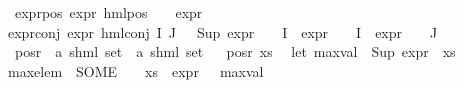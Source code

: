 \begin{isabellebody}
\ expr{\isacharunderscore}{\kern0pt}{}{\isacharunderscore}{\kern0pt}pos{\isacharcolon}{\kern0pt}\ {\isacartoucheopen}expr{\isacharunderscore}{\kern0pt}{}\ {\isacharparenleft}{\kern0pt}hml{\isacharunderscore}{\kern0pt}pos\ {\isasymalpha}\ {\isasymphi}{\isacharparenright}{\kern0pt}\ {\isacharequal}{\kern0pt}\ expr{\isacharunderscore}{\kern0pt}{}\ {\isasymphi}{\isacartoucheclose}\ {\isacharbar}{\kern0pt}\ \isanewline
expr{\isacharunderscore}{\kern0pt}{}{\isacharunderscore}{\kern0pt}conj{\isacharcolon}{\kern0pt}\ {\isacartoucheopen}expr{\isacharunderscore}{\kern0pt}{}\ {\isacharparenleft}{\kern0pt}hml{\isacharunderscore}{\kern0pt}conj\ I\ J\ {\isasymPhi}{\isacharparenright}{\kern0pt}\ {\isacharequal}{\kern0pt}\ {\isacharparenleft}{\kern0pt}Sup\ {\isacharparenleft}{\kern0pt}{\isacharparenleft}{\kern0pt}expr{\isacharunderscore}{\kern0pt}{}\ {\isasymcirc}\ {\isasymPhi}{\isacharparenright}{\kern0pt}\ {\isacharbackquote}{\kern0pt}\ I\ {\isasymunion}\ {\isacharparenleft}{\kern0pt}expr{\isacharunderscore}{\kern0pt}{}\ {\isasymcirc}\ {\isasymPhi}{\isacharparenright}{\kern0pt}\ {\isacharbackquote}{\kern0pt}\ I\ {\isasymunion}\ {\isacharparenleft}{\kern0pt}expr{\isacharunderscore}{\kern0pt}{}\ {\isasymcirc}\ {\isasymPhi}{\isacharparenright}{\kern0pt}\ {\isacharbackquote}{\kern0pt}\ J{\isacharparenright}{\kern0pt}{\isacharparenright}{\kern0pt}{\isacartoucheclose}\isanewline
\isanewline
{}\isamarkupfalse%
\ pos{\isacharunderscore}{\kern0pt}r\ {\isacharcolon}{\kern0pt}{\isacharcolon}{\kern0pt}\ {\isachardoublequoteopen}{\isacharparenleft}{\kern0pt}{\isacharprime}{\kern0pt}a{\isacharcomma}{\kern0pt}\ {\isacharprime}{\kern0pt}s{\isacharparenright}{\kern0pt}hml\ set\ {\isasymRightarrow}\ {\isacharparenleft}{\kern0pt}{\isacharprime}{\kern0pt}a{\isacharcomma}{\kern0pt}\ {\isacharprime}{\kern0pt}s{\isacharparenright}{\kern0pt}hml\ set{\isachardoublequoteclose}\isanewline
\ \ \isanewline
{\isachardoublequoteopen}pos{\isacharunderscore}{\kern0pt}r\ xs\ {\isacharequal}{\kern0pt}\ {\isacharparenleft}{\kern0pt}\isanewline
let\ max{\isacharunderscore}{\kern0pt}val\ {\isacharequal}{\kern0pt}\ {\isacharparenleft}{\kern0pt}Sup\ {\isacharparenleft}{\kern0pt}expr{\isacharunderscore}{\kern0pt}{}\ {\isacharbackquote}{\kern0pt}\ xs{\isacharparenright}{\kern0pt}{\isacharparenright}{\kern0pt}{\isacharsemicolon}{\kern0pt}\ \isanewline
max{\isacharunderscore}{\kern0pt}elem\ {\isacharequal}{\kern0pt}\ {\isacharparenleft}{\kern0pt}SOME\ {\isasympsi}{\isachardot}{\kern0pt}\ {\isasympsi}\ {\isasymin}\ xs\ {\isasymand}\ expr{\isacharunderscore}{\kern0pt}{}\ {\isasympsi}\ {\isacharequal}{\kern0pt}\ max{\isacharunderscore}{\kern0pt}val{\isacharparenright}{\kern0pt}{\isacharsemicolon}{\kern0pt}\isanewline

\end{isabellebody}
